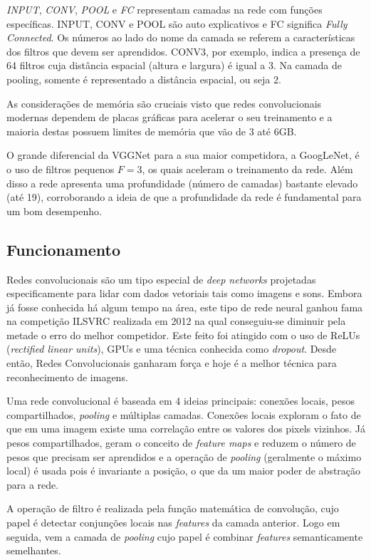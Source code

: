 \emph{INPUT}, \emph{CONV}, \emph{POOL} e \emph{FC} representam camadas na rede
com funções específicas. INPUT, CONV e POOL são auto explicativos e FC
significa \emph{Fully Connected}. Os números ao lado do nome da camada se
referem a características dos filtros que devem ser aprendidos. CONV3, por
exemplo, indica a presença de 64 filtros cuja distância espacial (altura e
largura) é igual a 3. Na camada de pooling, somente é representado a distância
espacial, ou seja 2.

As considerações de memória são cruciais visto que redes convolucionais
modernas dependem de placas gráficas para acelerar o seu treinamento e a
maioria destas possuem limites de memória que vão de 3 até 6GB\@.


O grande diferencial da VGGNet para a sua maior competidora, a GoogLeNet, é o
uso de filtros pequenos \emph{$F=3$}, os quais aceleram o treinamento da rede.
Além disso a rede apresenta uma profundidade (número de camadas) bastante
elevado (até 19), corroborando a ideia de que a profundidade da rede é
fundamental para um bom desempenho.

\subsection{Funcionamento}

Redes convolucionais são um tipo especial de \emph{deep networks} projetadas
especificamente para lidar com dados vetoriais tais como imagens e sons.
Embora já fosse conhecida há algum tempo na área, este tipo de rede neural
ganhou fama na competição ILSVRC realizada em 2012 na qual conseguiu-se
diminuir pela metade o erro do melhor competidor. Este feito foi atingido com o
uso de ReLUs (\emph{rectified linear units}), GPUs e uma técnica conhecida como
\emph{dropout}. Desde então, Redes Convolucionais ganharam força e hoje é a
melhor técnica para reconhecimento de imagens.\cite{lecun2015deep}

Uma rede convolucional é baseada em 4 ideias principais: conexões locais, pesos
compartilhados, \emph{pooling} e múltiplas camadas. Conexões locais exploram o
fato de que em uma imagem existe uma correlação entre os valores dos pixels
vizinhos. Já pesos compartilhados, geram o conceito de \emph{feature maps} e
reduzem o número de pesos que precisam ser aprendidos e a operação de
\emph{pooling} (geralmente o máximo local) é usada pois é invariante a posição,
o que da um maior poder de abstração para a rede.\cite{lecun2015deep}

A operação de filtro é realizada pela função matemática de convolução, cujo
papel é detectar conjunções locais nas \emph{features} da camada anterior. Logo
em seguida, vem a camada de \emph{pooling} cujo papel é combinar \emph{features}
semanticamente semelhantes.\cite{lecun2015deep}

